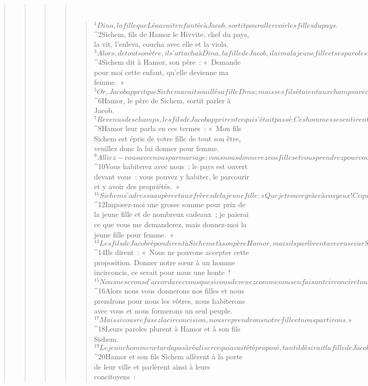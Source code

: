 \begin{verse}
\begin{verse}
\begin{verse}
\begin{verse}
         
      \bchapter{}
      \begin{verse}
${}^{1}Dina, la fille que Léa avait enfantée à Jacob, sortit pour aller voir les filles du pays. 
${}^{2}Sichem, fils de Hamor le Hivvite, chef du pays, la vit, l’enleva, coucha avec elle et la viola. 
${}^{3}Alors, de tout son être, il s’attacha à Dina, la fille de Jacob, il aima la jeune fille et ses paroles touchèrent le cœur de celle-ci. 
${}^{4}Sichem dit à Hamor, son père : « Demande pour moi cette enfant, qu’elle devienne ma femme. » 
${}^{5}Or, Jacob apprit que Sichem avait souillé sa fille Dina ; mais ses fils étaient aux champs avec le troupeau, et il garda le silence jusqu’à leur retour.
${}^{6}Hamor, le père de Sichem, sortit parler à Jacob. 
${}^{7}Revenus des champs, les fils de Jacob apprirent ce qui s’était passé. Ces hommes se sentirent outragés et furent pris d’une grande colère car Sichem avait commis une infamie envers Israël en couchant avec la fille de Jacob : c’est une chose qui ne se fait pas. 
${}^{8}Hamor leur parla en ces termes : « Mon fils Sichem est épris de votre fille de tout son être, veuillez donc la lui donner pour femme. 
${}^{9}Alliez-vous avec nous par mariage : vous nous donnerez vos filles et vous prendrez pour vous les nôtres. 
${}^{10}Vous habiterez avec nous ; le pays est ouvert devant vous : vous pouvez y habiter, le parcourir et y avoir des propriétés. »
${}^{11}Sichem s’adressa au père et aux frères de la jeune fille : « Que je trouve grâce à vos yeux ! Ce que vous me demanderez, je le donnerai. 
${}^{12}Imposez-moi une grosse somme pour prix de la jeune fille et de nombreux cadeaux ; je paierai ce que vous me demanderez, mais donnez-moi la jeune fille pour femme. »
${}^{13}Les fils de Jacob répondirent à Sichem et à son père Hamor, mais ils parlèrent avec ruse car Sichem avait souillé leur sœur Dina. 
${}^{14}Ils dirent : « Nous ne pouvons accepter cette proposition. Donner notre sœur à un homme incirconcis, ce serait pour nous une honte ! 
${}^{15}Nous ne serons d’accord avec vous que si vous devenez comme nous en faisant circoncire tous vos mâles. 
${}^{16}Alors nous vous donnerons nos filles et nous prendrons pour nous les vôtres, nous habiterons avec vous et nous formerons un seul peuple. 
${}^{17}Mais si vous refusez la circoncision, nous reprendrons notre fille et nous partirons. » 
${}^{18}Leurs paroles plurent à Hamor et à son fils Sichem. 
${}^{19}Le jeune homme ne tarda pas à réaliser ce qui avait été proposé, tant il désirait la fille de Jacob. Il était l’homme le plus influent dans la maison de son père.
${}^{20}Hamor et son fils Sichem allèrent à la porte de leur ville et parlèrent ainsi à leurs concitoyens : 

\end{verse}
\end{verse}
\end{verse}
\end{verse}
\end{verse}
